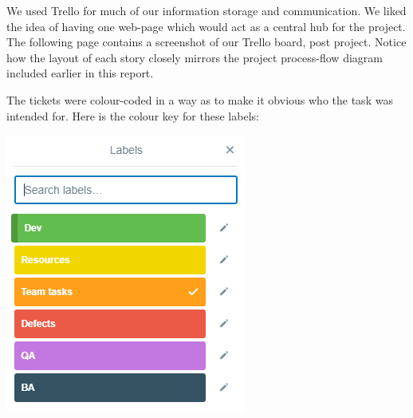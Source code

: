 \documentclass[12pt]{article}
\begin{document}
We used Trello for much of our information storage and communication. We liked the idea of having one web-page which would act as a central hub for the project. The following page contains a screenshot of our Trello board, post project. Notice how the layout of each story closely mirrors the project process-flow diagram included earlier in this report.

\noindent{}

The tickets were colour-coded in a way as to make it obvious who the task was intended for. Here is the colour key for these labels:

\begin{center}
    \includegraphics{trello2.png}
\end{center}
\end{document}
